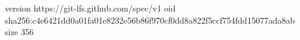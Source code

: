version https://git-lfs.github.com/spec/v1
oid sha256:c4e6421dd0a01fa01e8232e56b86f970cf0dd8a822f5ccf754fdd15077ada8ab
size 356
